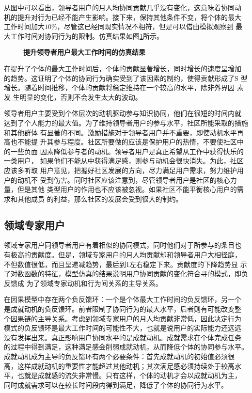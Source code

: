 从图中可以看出，领导者用户的月人均协同贡献几乎没有变化，这意味着协同动
机的提升对行为已经不能产生影响。接下来，保持其他条件不变，将个体的最大
工作时间加大$10\%$，尽管这已经同现实情况不相符，但是可以借由模拟观察到
最大工作时间对协同行为的限制。仿真结果如图\ref{fig:improve2}所示。

\begin{figure}
  \centering
  
\caption{\small{\textbf{提升领导者用户最大工作时间的仿真结果}}}
  \label{fig:improve2}
\end{figure}

在提升了个体的最大工作时间后，个体的贡献显著增长，同时增长的速度呈增加
的趋势。这证明了个体的协同行为确实受到了该因素的制约，使得贡献形成了S
型增长。随着时间推移，个体的贡献将稳定维持在一个较高的水平，除非外界因
素发
生明显的变化，否则不会发生太大的波动。

领导者用户主要受到个体层次的动机驱动参与知识协同，他们在很短的时间内就
达到了个人能力的最大值。为了维持领导者用户的参与水平，社区所能采取的措施和其他群体
有显著的不同。激励措施对于领导者用户并不重要，即使动机水平再高也不能提
升其参与程度。社区所要做的应该是保护用户的热情，不要使社区中的一些负面
因素降低参与者的动机。领导者用户是真正希望从工作中获得快乐的一类用户，
如果他们不能从中获得满足感，则参与动机会很快消失。为此，社区应该多听取
用户意见，把握好社区发展的方向，尽力满足用户需求，努力维护用户的动机不
受到伤害。同时社区应该注意到，尽管领导者用户是社区的核心力量，但是其他
类型用户的作用也不应该被忽视。如果社区不能平衡核心用户的需求和其他成员
的利益，那么社区的发展会受到很大的制约。

\subsection{领域专家用户}
领域专家用户同领导者用户有着相似的协同模式，同时他们对于所参与的条目也
有极高的贡献度。但是，领域专家用户的月人均贡献却和领导者用户大相径庭，
不但数值很低，而且呈递减趋势，最后到1左右稳定下来。贡献度的下降趋势显
示了对数函数的特征，模型仿真的结果说明用户协同贡献的变化符合寻的模式，即负反馈成
为了领域专家动机和行为间关系的主导关系。

在因果模型中存在两个负反馈环：一个是个体最大工作时间的负反馈环，另一个
是成就动机的负反馈环。前者限制了协同行为的最大水平，后者则有可能改变整
个因果链的主导关系。考虑到领域专家用户的月人均贡献非常低，因此决定行为
模式的负反馈环是最大工作时间的可能性不大，也就是说用户的实际能力还远远
没有发挥出来。真正影响用户协同水平的是成就动机。成就需求在个体完成任务
的过程中得到满足，这种满足感会削弱成就动机，从而降低个体的协同参与水平。
成就动机成为主导的负反馈环有两个必要条件：首先成就动机的初始值必须很
高，这样成就动机的重要性才能超过其他动机；其次满足感必须持续处于较高水
平，也就是成就感的流失非常慢。只有这样，个体的动机才会以成就动机为主，
同时成就需求可以在较长时间段内得到满足，降低了个体的协同行为水平。 

